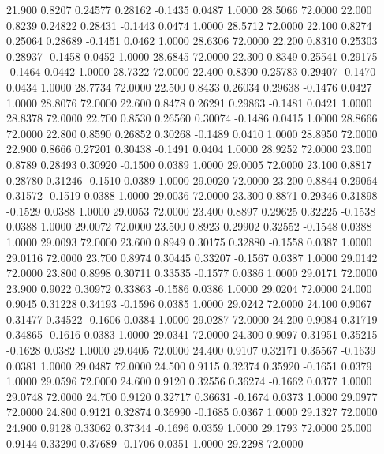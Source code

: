   21.900   0.8207   0.24577   0.28162  -0.1435   0.0487   1.0000  28.5066  72.0000
  22.000   0.8239   0.24822   0.28431  -0.1443   0.0474   1.0000  28.5712  72.0000
  22.100   0.8274   0.25064   0.28689  -0.1451   0.0462   1.0000  28.6306  72.0000
  22.200   0.8310   0.25303   0.28937  -0.1458   0.0452   1.0000  28.6845  72.0000
  22.300   0.8349   0.25541   0.29175  -0.1464   0.0442   1.0000  28.7322  72.0000
  22.400   0.8390   0.25783   0.29407  -0.1470   0.0434   1.0000  28.7734  72.0000
  22.500   0.8433   0.26034   0.29638  -0.1476   0.0427   1.0000  28.8076  72.0000
  22.600   0.8478   0.26291   0.29863  -0.1481   0.0421   1.0000  28.8378  72.0000
  22.700   0.8530   0.26560   0.30074  -0.1486   0.0415   1.0000  28.8666  72.0000
  22.800   0.8590   0.26852   0.30268  -0.1489   0.0410   1.0000  28.8950  72.0000
  22.900   0.8666   0.27201   0.30438  -0.1491   0.0404   1.0000  28.9252  72.0000
  23.000   0.8789   0.28493   0.30920  -0.1500   0.0389   1.0000  29.0005  72.0000
  23.100   0.8817   0.28780   0.31246  -0.1510   0.0389   1.0000  29.0020  72.0000
  23.200   0.8844   0.29064   0.31572  -0.1519   0.0388   1.0000  29.0036  72.0000
  23.300   0.8871   0.29346   0.31898  -0.1529   0.0388   1.0000  29.0053  72.0000
  23.400   0.8897   0.29625   0.32225  -0.1538   0.0388   1.0000  29.0072  72.0000
  23.500   0.8923   0.29902   0.32552  -0.1548   0.0388   1.0000  29.0093  72.0000
  23.600   0.8949   0.30175   0.32880  -0.1558   0.0387   1.0000  29.0116  72.0000
  23.700   0.8974   0.30445   0.33207  -0.1567   0.0387   1.0000  29.0142  72.0000
  23.800   0.8998   0.30711   0.33535  -0.1577   0.0386   1.0000  29.0171  72.0000
  23.900   0.9022   0.30972   0.33863  -0.1586   0.0386   1.0000  29.0204  72.0000
  24.000   0.9045   0.31228   0.34193  -0.1596   0.0385   1.0000  29.0242  72.0000
  24.100   0.9067   0.31477   0.34522  -0.1606   0.0384   1.0000  29.0287  72.0000
  24.200   0.9084   0.31719   0.34865  -0.1616   0.0383   1.0000  29.0341  72.0000
  24.300   0.9097   0.31951   0.35215  -0.1628   0.0382   1.0000  29.0405  72.0000
  24.400   0.9107   0.32171   0.35567  -0.1639   0.0381   1.0000  29.0487  72.0000
  24.500   0.9115   0.32374   0.35920  -0.1651   0.0379   1.0000  29.0596  72.0000
  24.600   0.9120   0.32556   0.36274  -0.1662   0.0377   1.0000  29.0748  72.0000
  24.700   0.9120   0.32717   0.36631  -0.1674   0.0373   1.0000  29.0977  72.0000
  24.800   0.9121   0.32874   0.36990  -0.1685   0.0367   1.0000  29.1327  72.0000
  24.900   0.9128   0.33062   0.37344  -0.1696   0.0359   1.0000  29.1793  72.0000
  25.000   0.9144   0.33290   0.37689  -0.1706   0.0351   1.0000  29.2298  72.0000

